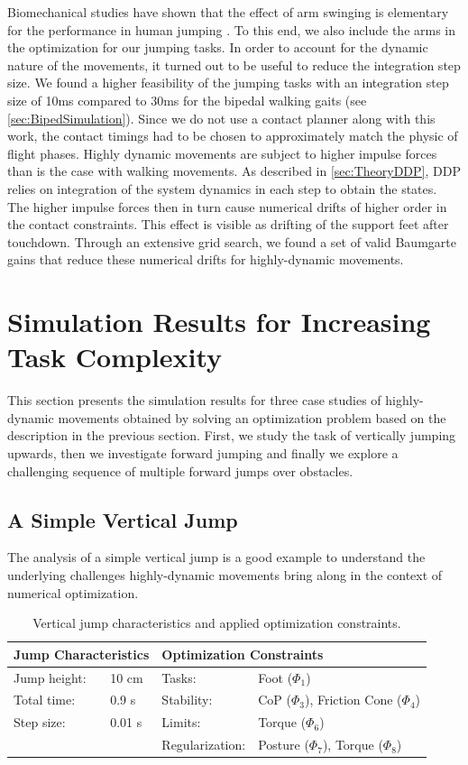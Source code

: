 Biomechanical studies have shown that the effect of arm swinging is elementary for the performance in human jumping \cite{harman1990effects}. To this end, we also include the arms in the optimization for our jumping tasks. 
In order to account for the dynamic nature of the movements, it turned out to be useful to reduce the integration step size. We found a higher feasibility of the jumping tasks with an integration step size of 10ms compared to 30ms for the bipedal walking gaits (see \cref{sec:BipedSimulation}). Since we do not use a contact planner along with this work, the contact timings had to be chosen to approximately match the physic of flight phases. 
Highly dynamic movements are subject to higher impulse forces than is the case with walking movements. As described in \ref{sec:TheoryDDP}, \gls{DDP} relies on integration of the system dynamics in each step to obtain the states. The higher impulse forces then in turn cause numerical drifts of higher order in the contact constraints. This effect is visible as drifting of the support feet after touchdown. Through an extensive grid search, we found a set of valid Baumgarte gains that reduce these numerical drifts for highly-dynamic movements.

\section{Simulation Results for Increasing Task Complexity}
This section presents the simulation results for three case studies of highly-dynamic movements obtained by solving an optimization problem based on the description in the previous section. First, we study the task of vertically jumping upwards, then we investigate forward jumping and finally we explore a challenging sequence of multiple forward jumps over obstacles.

\subsection{A Simple Vertical Jump}
The analysis of a simple vertical jump is a good example to understand the underlying challenges highly-dynamic movements bring along in the context of numerical optimization.

\begin{table}[t]
\centering
\caption{Vertical jump characteristics and applied optimization constraints.}
\begin{tabular}{|ll|ll|}
\hline
\multicolumn{2}{|l|}{\textbf{Jump Characteristics}} & \multicolumn{2}{l|}{\textbf{Optimization Constraints}} \\ \hline
Jump height:& 10 cm 	& Tasks: 			& Foot ($\Phi_1$) \\ \hline
Total time:& 0.9 s 		& Stability:    & \gls{CoP} ($\Phi_3$), Friction Cone ($\Phi_4$)\\ \hline
Step size:& 0.01 s 	& Limits: 			& Torque ($\Phi_6$)\\ \hline
& 					& Regularization: 	& Posture ($\Phi_7$), Torque ($\Phi_8$)\\ \hline
\end{tabular}
\label{tab:jumpVertical}
\end{table}

